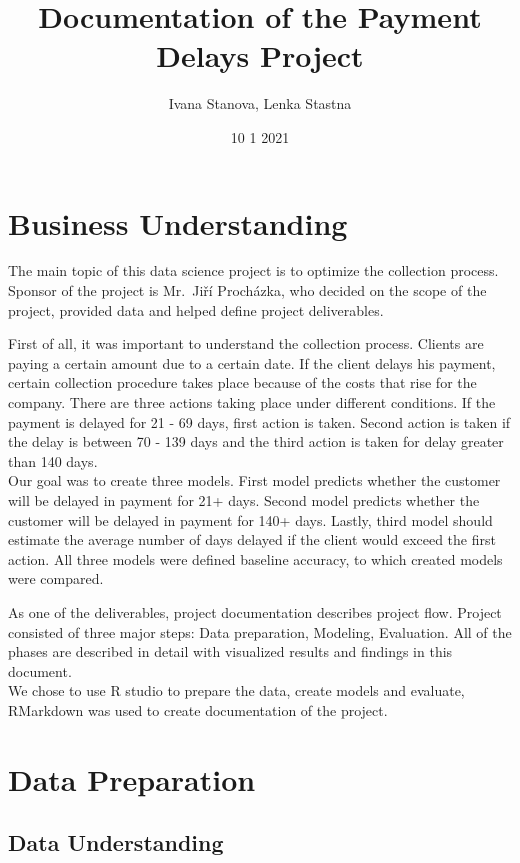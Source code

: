 \documentclass[
]{article}
\title{Documentation of the Payment Delays Project}
\author{Ivana Stanova, Lenka Stastna}
\date{10 1 2021}
\begin{document}
\maketitle

{
\setcounter{tocdepth}{2}
\tableofcontents
}
\hypertarget{business-understanding}{%
\section{Business Understanding}\label{business-understanding}}

The main topic of this data science project is to optimize the collection process. Sponsor of the project is Mr.~Jiří Procházka, who decided on the scope of the project, provided data and helped define project deliverables.

First of all, it was important to understand the collection process. Clients are paying a certain amount due to a certain date. If the client delays his payment, certain collection procedure takes place because of the costs that rise for the company. There are three actions taking place under different conditions. If the payment is delayed for 21 - 69 days, first action is taken. Second action is taken if the delay is between 70 - 139 days and the third action is taken for delay greater than 140 days.\\
Our goal was to create three models. First model predicts whether the customer will be delayed in payment for 21+ days. Second model predicts whether the customer will be delayed in payment for 140+ days. Lastly, third model should estimate the average number of days delayed if the client would exceed the first action. All three models were defined baseline accuracy, to which created models were compared.

As one of the deliverables, project documentation describes project flow. Project consisted of three major steps: Data preparation, Modeling, Evaluation. All of the phases are described in detail with visualized results and findings in this document.\\
We chose to use R studio to prepare the data, create models and evaluate, RMarkdown was used to create documentation of the project.

\hypertarget{data-preparation}{%
\section{Data Preparation}\label{data-preparation}}

\hypertarget{data-understanding}{%
\subsection{Data Understanding}\label{data-understanding}}
\end{document}
